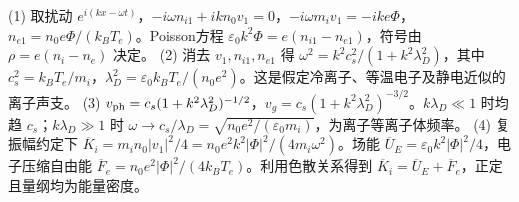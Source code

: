 (1) 取扰动 \(e^{i(kx-\omega t)}\)，\(-i\omega n_{i1}+ikn_0v_1=0\)，\(-i\omega m_iv_1=-ike\Phi\)，\(n_{e1}=n_0e\Phi/(k_BT_e)\)。Poisson方程 \(\varepsilon_0k^2\Phi=e(n_{i1}-n_{e1})\)，符号由 \(\rho=e(n_i-n_e)\) 决定。
(2) 消去 \(v_1,n_{i1},n_{e1}\) 得 \(\omega^2=k^2c_s^2/(1+k^2\lambda_D^2)\)，其中 \(c_s^2=k_BT_e/m_i\)，\(\lambda_D^2=\varepsilon_0k_BT_e/(n_0e^2)\)。这是假定冷离子、等温电子及静电近似的离子声支。
(3) \(v_{\rm ph}=c_s(1+k^2\lambda_D^2)^{-1/2}\)，\(v_g=c_s(1+k^2\lambda_D^2)^{-3/2}\)。\(k\lambda_D\ll1\) 时均趋 \(c_s\)；\(k\lambda_D\gg1\) 时 \(\omega\to c_s/\lambda_D=\sqrt{n_0e^2/(\varepsilon_0m_i)}\)，为离子等离子体频率。
(4) 复振幅约定下 \(\overline K_i=m_in_0|v_1|^2/4=n_0e^2k^2|\Phi|^2/(4m_i\omega^2)\)。场能 \(\overline U_E=\varepsilon_0k^2|\Phi|^2/4\)，电子压缩自由能 \(\overline F_e=n_0e^2|\Phi|^2/(4k_BT_e)\)。利用色散关系得到 \(\overline K_i=\overline U_E+\overline F_e\)，正定且量纲均为能量密度。
